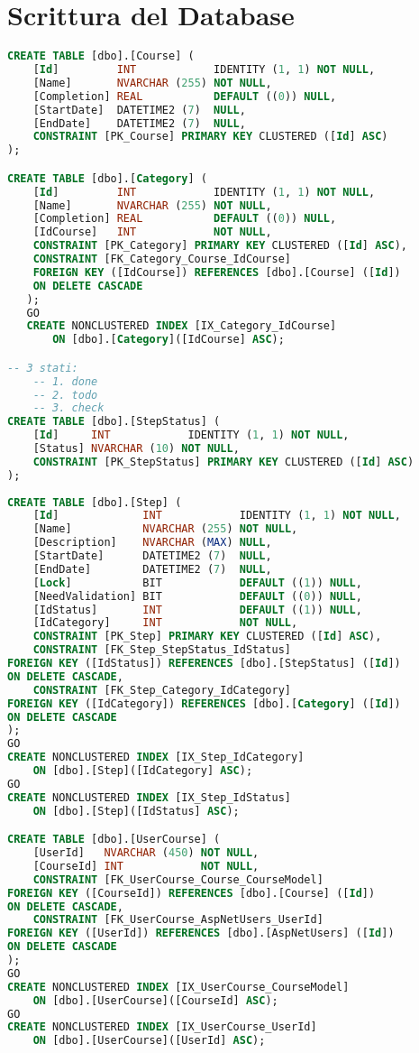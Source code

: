 \chapter{Scrittura del Database}
%
\label{appendice-database}
\begin{lstlisting}[language=SQL, caption=traduzione della progettazione del database nel linguaggio SQL]
CREATE TABLE [dbo].[Course] ( 
    [Id]         INT            IDENTITY (1, 1) NOT NULL, 
    [Name]       NVARCHAR (255) NOT NULL, 
    [Completion] REAL           DEFAULT ((0)) NULL, 
    [StartDate]  DATETIME2 (7)  NULL, 
    [EndDate]    DATETIME2 (7)  NULL, 
    CONSTRAINT [PK_Course] PRIMARY KEY CLUSTERED ([Id] ASC) 
); 

CREATE TABLE [dbo].[Category] ( 
    [Id]         INT            IDENTITY (1, 1) NOT NULL, 
    [Name]       NVARCHAR (255) NOT NULL, 
    [Completion] REAL           DEFAULT ((0)) NULL, 
    [IdCourse]   INT            NOT NULL, 
    CONSTRAINT [PK_Category] PRIMARY KEY CLUSTERED ([Id] ASC), 
    CONSTRAINT [FK_Category_Course_IdCourse]
	FOREIGN KEY ([IdCourse]) REFERENCES [dbo].[Course] ([Id]) 
	ON DELETE CASCADE 
   ); 
   GO 
   CREATE NONCLUSTERED INDEX [IX_Category_IdCourse] 
	   ON [dbo].[Category]([IdCourse] ASC); 	

-- 3 stati: 
	-- 1. done 
	-- 2. todo 
	-- 3. check 
CREATE TABLE [dbo].[StepStatus] ( 
	[Id]     INT            IDENTITY (1, 1) NOT NULL, 
	[Status] NVARCHAR (10) NOT NULL, 
	CONSTRAINT [PK_StepStatus] PRIMARY KEY CLUSTERED ([Id] ASC) 
); 
	
CREATE TABLE [dbo].[Step] ( 
	[Id]             INT            IDENTITY (1, 1) NOT NULL, 
	[Name]           NVARCHAR (255) NOT NULL, 
	[Description]    NVARCHAR (MAX) NULL, 
	[StartDate]      DATETIME2 (7)  NULL, 
	[EndDate]        DATETIME2 (7)  NULL, 
	[Lock]           BIT            DEFAULT ((1)) NULL, 
	[NeedValidation] BIT            DEFAULT ((0)) NULL, 
	[IdStatus]       INT            DEFAULT ((1)) NULL, 
	[IdCategory]     INT            NOT NULL, 
	CONSTRAINT [PK_Step] PRIMARY KEY CLUSTERED ([Id] ASC), 
	CONSTRAINT [FK_Step_StepStatus_IdStatus]  
FOREIGN KEY ([IdStatus]) REFERENCES [dbo].[StepStatus] ([Id]) 
ON DELETE CASCADE, 
	CONSTRAINT [FK_Step_Category_IdCategory]  
FOREIGN KEY ([IdCategory]) REFERENCES [dbo].[Category] ([Id]) 
ON DELETE CASCADE 
); 
GO 
CREATE NONCLUSTERED INDEX [IX_Step_IdCategory] 
	ON [dbo].[Step]([IdCategory] ASC); 
GO 
CREATE NONCLUSTERED INDEX [IX_Step_IdStatus] 
	ON [dbo].[Step]([IdStatus] ASC); 

CREATE TABLE [dbo].[UserCourse] ( 
	[UserId]   NVARCHAR (450) NOT NULL, 
	[CourseId] INT            NOT NULL, 
	CONSTRAINT [FK_UserCourse_Course_CourseModel]  
FOREIGN KEY ([CourseId]) REFERENCES [dbo].[Course] ([Id]) 
ON DELETE CASCADE, 
	CONSTRAINT [FK_UserCourse_AspNetUsers_UserId]  
FOREIGN KEY ([UserId]) REFERENCES [dbo].[AspNetUsers] ([Id]) 
ON DELETE CASCADE 
); 
GO 
CREATE NONCLUSTERED INDEX [IX_UserCourse_CourseModel] 
    ON [dbo].[UserCourse]([CourseId] ASC); 
GO 
CREATE NONCLUSTERED INDEX [IX_UserCourse_UserId] 
    ON [dbo].[UserCourse]([UserId] ASC); 
 

\end{lstlisting}
